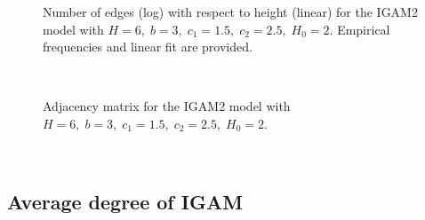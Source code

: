 \documentclass[11pt]{article}
\begin{document}
    \begin{figure}
    \begin{center}
    \caption{Number of edges (log) with respect to height (linear) for the IGAM2 model with $H = 6, \; b = 3, \; c_1 = 1.5, \; c_2 = 2.5, \; H_0 = 2$. Empirical frequencies and linear fit are provided.}
    \end{center}
    \end{figure}
    { \hspace*{\fill} \\}
    
%    
%
%   
    
    \begin{figure}
    \begin{center}
	\caption{Adjacency matrix for the IGAM2 model with $H = 6, \; b = 3, \; c_1 = 1.5, \; c_2 = 2.5, \; H_0 = 2$.}    
    \end{center}
    \end{figure}
    { \hspace*{\fill} \\}
    
    \hypertarget{average-degree-of-igam}{%
\subsection{Average degree of IGAM}\label{average-degree-of-igam}}
\end{document}
